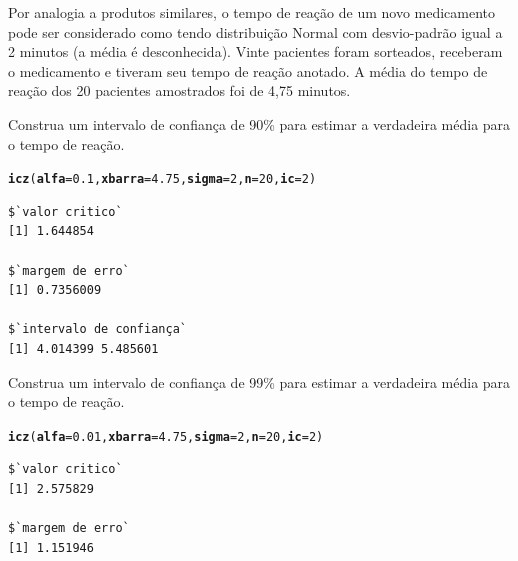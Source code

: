 \documentclass[a4paper,11pt,fleqn]{article}\usepackage[]{graphicx}\usepackage[]{color}
\makeatletter
\newcommand{\hlnum}[1]{\textcolor[rgb]{0,0,0}{#1}}%
\newcommand{\hlstd}[1]{\textcolor[rgb]{0,0,0}{#1}}%
\newcommand{\hlkwc}[1]{\textcolor[rgb]{0,0,0}{\textbf{#1}}}%
\newcommand{\hlkwd}[1]{\textcolor[rgb]{0,0,0}{\textbf{#1}}}%
\newenvironment{kframe}{%
 \def\at@end@of@kframe{}%
 \ifinner\ifhmode%
  \def\at@end@of@kframe{\end{minipage}}%
  \begin{minipage}{\columnwidth}%
 \fi\fi%
 \def\FrameCommand##1{\hskip\@totalleftmargin \hskip-\fboxsep
 \colorbox{shadecolor}{##1}\hskip-\fboxsep
     \hskip-\linewidth \hskip-\@totalleftmargin \hskip\columnwidth}%
 \MakeFramed {\advance\hsize-\width
   \@totalleftmargin\z@ \linewidth\hsize
   \@setminipage}}%
 {\par\unskip\endMakeFramed%
 \at@end@of@kframe}
\newenvironment{knitrout}{}{} %
\theoremstyle{definition}
\makeatother
\begin{document}
\begin{compactenum}[5.] %

\item Por analogia a produtos similares, o tempo de reação de um novo
  medicamento pode ser considerado como tendo distribuição Normal com
  desvio-padrão igual a 2 minutos (a média é desconhecida). Vinte
  pacientes foram sorteados, receberam o medicamento e tiveram seu tempo
  de reação anotado. A média do tempo de reação dos 20 pacientes
  amostrados foi de 4,75 minutos.
  \begin{compactenum}
  \item Construa um intervalo de confiança de 90\% para estimar a
    verdadeira média para o tempo de reação.
\begin{knitrout}\small
{}\color{fgcolor}\begin{kframe}
\begin{alltt}
\hlkwd{icz}\hlstd{(}\hlkwc{alfa} \hlstd{=} \hlnum{0.1}\hlstd{,} \hlkwc{xbarra} \hlstd{=} \hlnum{4.75}\hlstd{,} \hlkwc{sigma} \hlstd{=} \hlnum{2}\hlstd{,} \hlkwc{n} \hlstd{=} \hlnum{20}\hlstd{,} \hlkwc{ic} \hlstd{=} \hlnum{2}\hlstd{)}
\end{alltt}
\begin{verbatim}
$`valor critico`
[1] 1.644854

$`margem de erro`
[1] 0.7356009

$`intervalo de confiança`
[1] 4.014399 5.485601
\end{verbatim}
\end{kframe}
\end{knitrout}
  \item Construa um intervalo de confiança de 99\% para estimar a
    verdadeira média para o tempo de reação.
\begin{knitrout}\small
{}\color{fgcolor}\begin{kframe}
\begin{alltt}
\hlkwd{icz}\hlstd{(}\hlkwc{alfa} \hlstd{=} \hlnum{0.01}\hlstd{,} \hlkwc{xbarra} \hlstd{=} \hlnum{4.75}\hlstd{,} \hlkwc{sigma} \hlstd{=} \hlnum{2}\hlstd{,} \hlkwc{n} \hlstd{=} \hlnum{20}\hlstd{,} \hlkwc{ic} \hlstd{=} \hlnum{2}\hlstd{)}
\end{alltt}
\begin{verbatim}
$`valor critico`
[1] 2.575829

$`margem de erro`
[1] 1.151946


\end{verbatim}
\end{kframe}
\end{knitrout}
\end{compactenum}
\end{compactenum}
\end{document}
